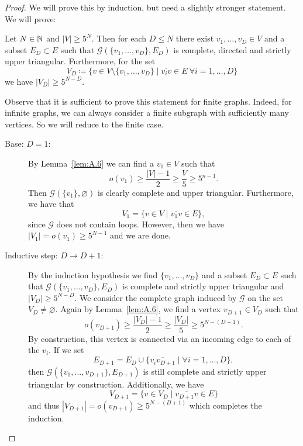 \begin{proof}
  We will prove this by induction, but need a slightly stronger statement. We will prove:

  Let \(N \in \mathbb{N}\) and \(|V| \geq 5^N\). Then for each \(D \leq N\) there exist \(v_1,\dots, v_D \in V\) and a subset \(E_D \subset E\) such that \(\mathcal{G}(\{v_1, \dots, v_D\}, E_D)\) is complete, directed and strictly upper triangular. Furthermore, for the set
  \[
    V_D \coloneqq \{v \in V \setminus \{v_1, \dots, v_D\} \mid \overline{v_iv} \in E\ \forall i =1,\dots, D\}
  \]
  we have \(|V_D| \geq 5^{N-D}\).

  Observe that it is sufficient to prove this statement for finite graphs. Indeed, for infinite graphs, we can always consider a finite subgraph with sufficiently many vertices. So we will reduce to the finite case.
  \begin{description}
  \item[Base: \(D = 1\):] By Lemma~\ref{lem:A.6} we can find a \(v_1 \in V\) such that
    \[
      o(v_1) \geq \frac{|V| - 1}{2} \geq \frac{V}{5} \geq 5^{n-1}.
    \]
    Then \(\mathcal{G}(\{v_1\}, \varnothing)\) is clearly complete and upper triangular. Furthermore, we have that
    \[
      V_1 = \{v \in V \mid \overline{v_1v} \in E\},
    \]
    since \(\mathcal{G}\) does not contain loops. However, then we have \(|V_1| = o(v_1) \geq 5^{N-1}\) and we are done.
  \item[Inductive step: \(D \to D+1\):] By the induction hypothesis we find \(\{v_1, \dots, v_D\}\) and a subset \(E_D \subset E\) such that \(\mathcal{G}(\{v_1, \dots, v_D\}, E_D)\) is complete and strictly upper triangular and \(|V_D| \geq 5^{N-D}\). We consider the complete graph induced by \(\mathcal{G}\) on the set \(V_D \neq \varnothing\). Again by Lemma~\ref{lem:A.6}, we find a vertex \(v_{D+1} \in V_D\) such that
    \[
      o(v_{D+1}) \geq \frac{|V_D| -1}{2} \geq \frac{|V_D|}{5} \geq 5^{N - (D+1)}.
    \]
    By construction, this vertex is connected via an incoming edge to each of the \(v_i\). If we set
    \[
      E_{D+1} = E_D \cup \{\overline{v_iv_{D+1}} \mid \forall i = 1, \dots, D\},
    \]
    then \(\mathcal{G}(\{v_1, \dots, v_{D+1}\}, E_{D+1})\) is still complete and strictly upper triangular by construction. Additionally, we have
    \[
      V_{D+1} = \{v \in V_D \mid \overline{v_{D+1}v} \in E\}
    \]
    and thus \(|V_{D+1}| = o(v_{D+1}) \geq 5^{N- (D+1)}\) which completes the induction.
  \end{description}
\end{proof}

